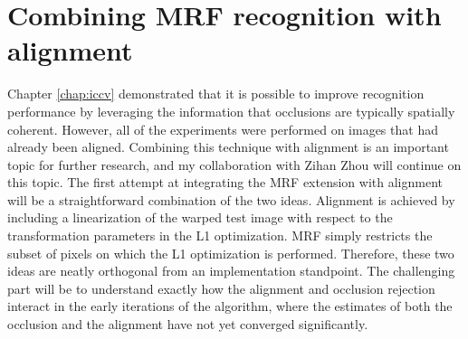 \section{Combining MRF recognition with alignment} Chapter \ref{chap:iccv} demonstrated that it is possible to improve recognition performance by leveraging the information that occlusions are typically spatially coherent.  However, all of the experiments were performed on images that had already been aligned.  Combining this technique with alignment is an important topic for further research, and my collaboration with Zihan Zhou will continue on this topic.  The first attempt at integrating the MRF extension with alignment will be a straightforward combination of the two ideas.  Alignment is achieved by including a linearization of the warped test image with respect to the transformation parameters in the L1 optimization.  MRF simply restricts the subset of pixels on which the L1 optimization is performed.  Therefore, these two ideas are neatly orthogonal from an implementation standpoint.  The challenging part will be to understand exactly how the alignment and occlusion rejection interact in the early iterations of the algorithm, where the estimates of both the occlusion and the alignment have not yet converged significantly.



